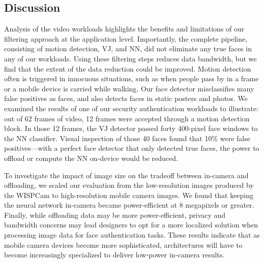 \subsection{Discussion}

Analysis of the video workloads highlights the benefits and limitations of our filtering approach at the application level. Importantly, the complete pipeline, consisting of motion detection, VJ, and NN, did not eliminate any true faces in any of our workloads. Using these filtering steps reduces data bandwidth, but we find that the extent of the data reduction could be improved. Motion detection often is triggered in innocuous situations, such as when people pass by in a frame or a mobile device is carried while walking. Our face detector misclassifies many false positives as faces, and also detects faces in static posters and photos. We examined the results of one of our security authentication workloads to illustrate: out of 62 frames of video, 12 frames were accepted through a motion detection block. In those 12 frames, the VJ detector passed forty 400-pixel face windows to the NN classifier. Visual inspection of those 40 faces found that 10\% were false positives---with a perfect face detector that only detected true faces, the power to offload or compute the NN on-device would be reduced.

To investigate the impact of image size on the tradeoff between in-camera and offloading, we scaled our evaluation from the low-resolution images produced by the WISPCam to high-resolution mobile camera images. We found that keeping the neural network in-camera became power-efficient at 8 megapixels or greater. Finally, while offloading data may be more power-efficient, privacy and bandwidth concerns may lead designers to opt for a more localized solution when processing image data for face authentication tasks. These results indicate that as mobile camera devices become more sophisticated, architectures will have to become increasingly specialized to deliver low-power in-camera results.





